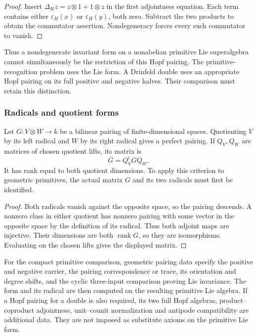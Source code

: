 \begin{proof}
Insert $\Delta_Kz=z\otimes1+1\otimes z$ in the first
adjointness equation. Each term contains either
$\varepsilon_H(x)$ or $\varepsilon_H(y)$, both zero.
Subtract the two products to obtain the commutator assertion.
Nondegeneracy forces every such commutator to vanish.
\end{proof}

Thus a nondegenerate invariant form on a nonabelian primitive
Lie superalgebra cannot simultaneously be the restriction of
this Hopf pairing. The primitive-recognition problem uses the
Lie form. A Drinfeld double uses an appropriate Hopf pairing
on its full positive and negative halves. Their comparison
must retain this distinction.


\subsubsection*{Radicals and quotient forms}

\begin{proposition}
\label{prop:finite-hall-quotient-pairing-nondegeneracy}
Let $G:V\otimes W\to k$ be a bilinear pairing of
finite-dimensional spaces. Quotienting $V$ by its left radical
and $W$ by its right radical gives a perfect pairing. If
$Q_V,Q_W$ are matrices of chosen quotient lifts, its matrix is
\[
 \overline G=Q_V^tGQ_W.
\]
It has rank equal to both quotient dimensions. To apply this
criterion to geometric primitives, the actual matrix $G$ and
its two radicals must first be identified.
\end{proposition}

\begin{proof}
Both radicals vanish against the opposite space, so the pairing
descends. A nonzero class in either quotient has nonzero pairing
with some vector in the opposite space by the definition of its
radical. Thus both adjoint maps are injective. Their dimensions
are both $\operatorname{rank}G$, so they are isomorphisms.
Evaluating on the chosen lifts gives the displayed matrix.
\end{proof}

\begin{definition}
\label{def:compact-geometric-hopf-pairing-datum}
For the compact primitive comparison, geometric pairing data
specify the positive and negative carrier, the pairing
correspondence or trace, its orientation and degree shifts, and
the cyclic three-input comparison proving Lie invariance.
The form and its radical are then computed on the resulting
primitive Lie algebra.
If a Hopf pairing for a double is also required, its two full
Hopf algebras, product--coproduct adjointness, unit--counit
normalization and antipode compatibility are additional data.
They are not imposed as substitute axioms on the primitive
Lie form.
\end{definition}

